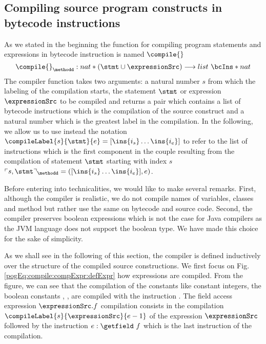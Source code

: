 

\subsection{Compiling source program  constructs in bytecode instructions} \label{pogEq:compile:compExpr} 

As we stated in the beginning the function for compiling program statements and expressions in bytecode instruction is named $\compile{}$
$$ \compile{ }_{\methodd} : nat * (\stmt \cup \expressionSrc ) \longrightarrow  list \ \bcIns * nat  $$
The compiler function takes two arguments: a natural number $s$ from which the labeling of the compilation starts,
 the statement $\stmt$ or expression $\expressionSrc$  to be compiled and
returns a pair which contains a list of bytecode instructions which is the compilation of the source construct
 and  a natural number which is the greatest label in the compilation. In the following, we allow us
to use instead the notation 
$ \compileLabel{s}{\stmt}{e} =[\ins{i_s} \ldots \ins{i_e} ] $
to refer to the list of instructions 
which is the first component in the couple resulting from the compilation of 
 statement $\stmt$  starting with index $s$ \ 
$\ulcorner  s, \stmt  \urcorner_{\methodd} = ( [\ins{i_s} \ldots \ins{i_e}], e) $.

Before entering into technicalities, we would like to make several remarks. First, although the compiler is realistic,
we do not compile names of variables, classes and method but rather use the same on bytecode and source code. Second,
 the compiler preserves boolean expressions which is not the case for Java compilers as the JVM language does not support
the boolean type. We have made this choice for the sake of simplicity.    
 
As we shall see in the following of this section, the compiler is defined inductively over the structure 
of the compiled source constructions. We first focus on Fig. \ref{pogEq:compile:compExpr:defExpr} how expressions
 are compiled. From the figure, we can see that the compilation of
 the constants like constant integers, the boolean constants
\Mytrue, \Myfalse, \Mynull{}  are compiled with the instruction \push. The field access expression $ \expressionSrc.f$ compilation consists in the compilation
$\compileLabel{s}{\expressionSrc}{e - 1}$ of the expression   $ \expressionSrc $ followed by the instruction $ e: \getfield  \ f $ which is
 the last instruction of the compilation.  

